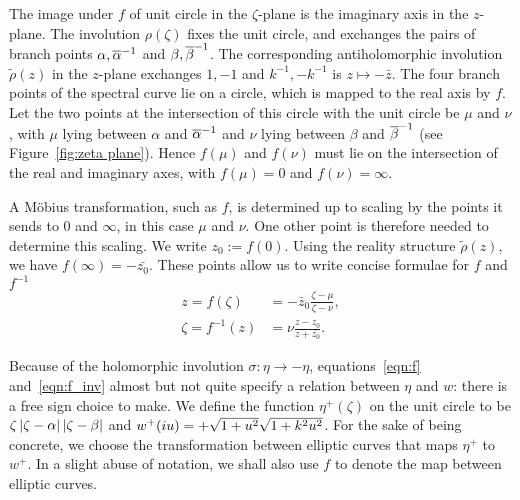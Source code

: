 \documentclass{article}
\begin{document}
The image under $f$ of unit circle in the $\zeta$-plane is the imaginary axis in the $z$-plane. The involution $\rho(\zeta)$ fixes the unit circle, and exchanges the pairs of branch points $\alpha,\overline{\alpha}^{-1}$ and $\beta,\overline{\beta}^{-1}$. The corresponding antiholomorphic involution $\tilde{\rho}(z)$ in the $z$-plane exchanges $1,-1$ and $k^{-1},-k^{-1}$ is $z\mapsto -\bar{z}$. The four branch points of the spectral curve lie on a circle, which is mapped to the real axis by $f$. Let the two points at the intersection of this circle with the unit circle be $\mu$ and $\nu$, with $\mu$ lying between $\alpha$ and $\overline{\alpha}^{-1}$ and $\nu$ lying between $\beta$ and $\overline{\beta}^{-1}$ (see Figure~\ref{fig:zeta plane}). Hence $f(\mu)$ and $f(\nu)$ must lie on the intersection of the real and imaginary axes, with $f(\mu) = 0$ and $f(\nu) = \infty$.

A M\"obius transformation, such as $f$, is determined up to scaling by the points it sends to $0$ and $\infty$, in this case $\mu$ and $\nu$. One other point is therefore needed to determine this scaling. We write $z_0 := f(0)$. Using the reality structure $\tilde{\rho}(z)$, we have $f(\infty) = -\bar{z_0}$. These points allow us to write concise formulae for $f$ and $f^{-1}$
\begin{align}
z = f(\zeta) &= -\bar{z}_0 \frac{\zeta - \mu}{\zeta - \nu},
\label{eqn:f} \\
\zeta = f^{-1}(z) &= \nu \frac{z - z_0}{z + \bar{z_0}}.
\label{eqn:f_inv}
\end{align}

Because of the holomorphic involution $\sigma: \eta\to-\eta$, equations~\eqref{eqn:f} and~\eqref{eqn:f_inv} almost but not quite specify a relation between $\eta$ and $w$: there is a free sign choice to make. 
We define the function $\eta^+(\zeta)$ on the unit circle to be $\zeta\left|\zeta-\alpha\right|\left|\zeta-\beta\right|$ and $w^+(i u) = + \sqrt{1+u^2}\sqrt{1+k^2u^2}$.
For the sake of being concrete, we choose the transformation between elliptic curves that maps $\eta^+$ to $w^+$.
In a slight abuse of notation, we shall also use $f$ to denote the map between elliptic curves.
\end{document}
